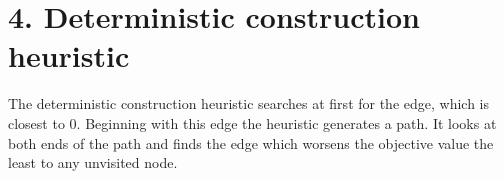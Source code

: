 \section*{4. Deterministic construction heuristic}
The deterministic construction heuristic searches at first for the edge, which is closest to 0. Beginning with this edge the heuristic generates a path. It looks at both ends of the path and finds the edge which worsens the objective value the least to any unvisited node.